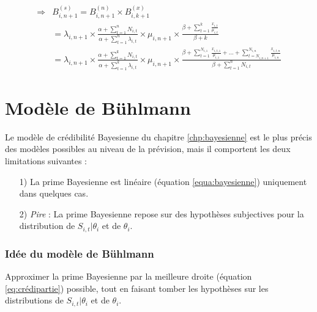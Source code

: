 \documentclass[11pt,french]{report}
\begin{document}
\begin{align*}
\Rightarrow & B_{i,n+1}^{(s)} = B_{i,n+1}^{(n)} \times B_{i,k+1}^{(x)} \\
&= \lambda_{i,n+1} \times \frac{\alpha + \sum_{t=1}^{n} N_{i,t}}{\alpha+ \sum_{t=1}^{n} \lambda_{i,t}} \times \mu_{i,n+1} \times \frac{\beta + \sum_{t=1}^{k}\frac{x_{i,t}} {\mu_{i,t}} }{\beta + k} \\
&= \lambda_{i,n+1} \times \frac{\alpha + \sum_{t=1}^{k} N_{i,t}}{\alpha+ \sum_{t=1}^{k} \lambda_{i,t}} \times \mu_{i,n+1} \times \frac{\beta + \sum_{t=1}^{N_{i,1}}\frac{ x_{i,t,1}}{\mu_{i,1}} +...+ \sum_{t=N_{i,n+1}}^{N_{i,n}}\frac{ x_{i,t,n}}{\mu_{i,n}} }{\beta + \sum_{t=1}^{n}N_{i,t}} 
\end{align*}

\chapter{Modèle de Bühlmann}

Le modèle de crédibilité Bayesienne du chapitre \ref{chp:bayesienne} est le plus précis des modèles possibles au niveau de la prévision, mais il comportent les deux limitations suivantes :
\begin{itemize}
\item[1)] La prime Bayesienne est linéaire (équation \ref{equa:bayesienne}) uniquement dans quelques cas.
\item[2)] \emph{Pire} : La prime Bayesienne repose sur des hypothèses subjectives pour la distribution de $S_{i,t}|\theta_i$ et de $\theta_i$.
\end{itemize}
\subsection*{Idée du modèle de Bühlmann}
Approximer la prime Bayesienne par la meilleure droite (équation \ref{eq:crédipartie}) possible, tout en faisant tomber les hypothèses sur les distributions de $S_{i,t}|\theta_i$ et de $\theta_i$.
\end{document}
